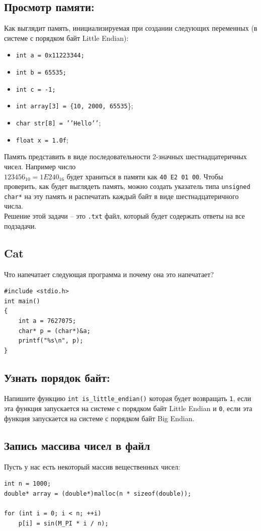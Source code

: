 \documentclass{article}
\begin{document}
\subsection{Просмотр памяти:}
Как выглядит память, инициализируемая при создании следующих переменных (в системе с порядком байт Little Endian):
\begin{itemize}
\item \texttt{int a = 0x11223344;}
\item \texttt{int b = 65535;}
\item \texttt{int c = -1;}
\item \texttt{int array[3] = \{10, 2000, 65535}\};
\item \texttt{char str[8] = '{}'Hello'{}'};
\item \texttt{float x = 1.0f};
\end{itemize}
Память представить в виде последовательности 2-значных шестнадцатеричных чисел. Например число \\
$123456_{10} = 1E240_{16}$ будет храниться в памяти как \texttt{40 E2 01 00}. Чтобы проверить, как будет выглядеть память, можно создать указатель типа \texttt{unsigned char*} на эту память и распечатать каждый байт в виде шестнадцатеричного числа.\\

Решение этой задачи -- это \texttt{.txt} файл, который будет содержать ответы на все подзадачи.


\subsection{Cat}
Что напечатает следующая программа и почему она это напечатает?
\begin{lstlisting} 
#include <stdio.h>
int main() 
{
    int a = 7627075;
    char* p = (char*)&a;
    printf("%s\n", p);
}
\end{lstlisting}

\subsection{Узнать порядок байт:}
Напишите функцию \texttt{int is\_little\_endian()} которая будет возвращать \texttt{1}, если эта функция запускается на системе с порядком байт Little Endian и \texttt{0}, если эта функция запускается на системе с порядком байт Big Endian.




\subsection{Запись массива чисел в файл}
Пусть у нас есть некоторый массив вещественных чисел:
\begin{lstlisting}
int n = 1000;
double* array = (double*)malloc(n * sizeof(double));

for (int i = 0; i < n; ++i)
    p[i] = sin(M_PI * i / n);
\end{lstlisting}
\end{document}

